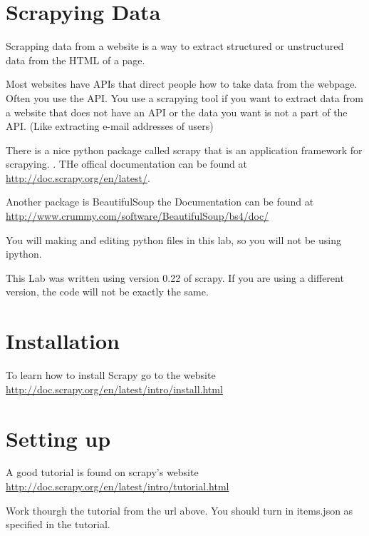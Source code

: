 
\section*{Scrapying Data}
Scrapping data from a website is a way to extract structured or unstructured data from the HTML of a page.

Most websites have APIs that direct people how to take data from the webpage. Often you use the API. You use a scrapying tool if you want to extract data from a website that does not have an API or the data you want is not a part of the API. (Like extracting e-mail addresses of users)

There is a nice python package called scrapy that is an application framework for scrapying. . THe offical documentation can be found at \url{http://doc.scrapy.org/en/latest/}. 

Another package is BeautifulSoup the Documentation can be found at \url{http://www.crummy.com/software/BeautifulSoup/bs4/doc/}

\begin{info}
You will making and editing python files in this lab, so you will not be using ipython.
\end{info}

\begin{warn}
This Lab was written using version 0.22 of scrapy. If you are using a different version, the code will not be exactly the same.
\end{warn}

\section*{Installation}

To learn how to install Scrapy go to the website \url{http://doc.scrapy.org/en/latest/intro/install.html}

\section*{Setting up}
A good tutorial is found on scrapy's website
\url{http://doc.scrapy.org/en/latest/intro/tutorial.html}

\begin{problem}
Work thourgh the tutorial from the url above. You should turn in items.json as specified in the tutorial.
\end{problem}

